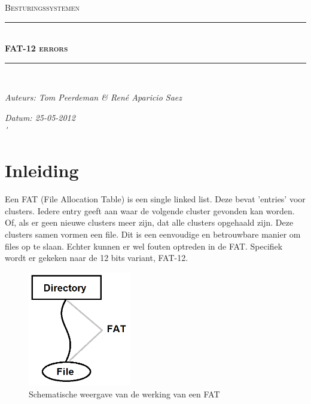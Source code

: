 \documentclass[11pt]{article}
\newcommand{\HRule}{\rule{\linewidth}{0.5mm}}
\begin{document}
	\begin{titlepage}
	\begin{center}
		\textsc{\Large Besturingssystemen}\\[0.5cm]
		\HRule \\[0,4cm]
		\textsc{\huge \bfseries FAT-12 errors}
		\HRule \\[8cm]
		\begin{minipage}{0.4\textwidth}
			\begin{flushleft}\large
				\emph{Auteurs: Tom Peerdeman \& Ren\'e Aparicio Saez}\\
			\end{flushleft}
		\end{minipage}
		\begin{minipage}{0.4\textwidth}
			\begin{flushright}\large
			\emph{Datum: 25-05-2012\\\'}\\
			\end{flushright}
		\end{minipage}
	\end{center}
	\end{titlepage}

	\tableofcontents
	\newpage

	\section{Inleiding}\label{sec:inleiding}
	Een FAT (File Allocation Table) is een single linked list. Deze bevat 'entries' voor clusters. Iedere entry geeft aan waar de volgende cluster gevonden kan worden. Of, als er geen nieuwe clusters meer zijn, dat alle clusters opgehaald zijn. Deze clusters samen vormen een file. Dit is een eenvoudige en betrouwbare manier om files op te slaan. Echter kunnen er wel fouten optreden in de FAT. Specifiek wordt er gekeken naar de 12 bits variant, FAT-12.
	\begin{figure}[h]
		\begin{center}
		\includegraphics[width=0.4\textwidth]{fatgoed.png}
		\caption{Schematische weergave van de werking van een 	FAT}
		\end{center}
	\end{figure}
\end{document}
